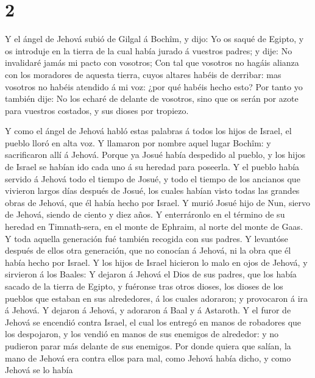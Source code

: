 \hypertarget{section-1}{%
\section{2}\label{section-1}}

 Y el ángel de Jehová subió de Gilgal á Bochîm, y dijo: Yo
os saqué de Egipto, y os introduje en la tierra de la cual había jurado
á vuestros padres; y dije: No invalidaré jamás mi pacto con vosotros;
 Con tal que vosotros no hagáis alianza con los moradores de
aquesta tierra, cuyos altares habéis de derribar: mas vosotros no habéis
atendido á mi voz: ¿por qué habéis hecho esto?  Por tanto yo
también dije: No los echaré de delante de vosotros, sino que os serán
por azote para vuestros costados, y sus dioses por tropiezo.

 Y como el ángel de Jehová habló estas palabras á todos los
hijos de Israel, el pueblo lloró en alta voz.  Y llamaron
por nombre aquel lugar Bochîm: y sacrificaron allí á Jehová.
 Porque ya Josué había despedido al pueblo, y los hijos de
Israel se habían ido cada uno á su heredad para poseerla.  Y
el pueblo había servido á Jehová todo el tiempo de Josué, y todo el
tiempo de los ancianos que vivieron largos días después de Josué, los
cuales habían visto todas las grandes obras de Jehová, que él había
hecho por Israel.  Y murió Josué hijo de Nun, siervo de
Jehová, siendo de ciento y diez años.  Y enterráronlo en el
término de su heredad en Timnath-sera, en el monte de Ephraim, al norte
del monte de Gaas.  Y toda aquella generación fué también
recogida con sus padres. Y levantóse después de ellos otra generación,
que no conocían á Jehová, ni la obra que él había hecho por Israel.
 Y los hijos de Israel hicieron lo malo en ojos de Jehová,
y sirvieron á los Baales:  Y dejaron á Jehová el Dios de
sus padres, que los había sacado de la tierra de Egipto, y fuéronse tras
otros dioses, los dioses de los pueblos que estaban en sus alrededores,
á los cuales adoraron; y provocaron á ira á Jehová.  Y
dejaron á Jehová, y adoraron á Baal y á Astaroth.  Y el
furor de Jehová se encendió contra Israel, el cual los entregó en manos
de robadores que los despojaron, y los vendió en manos de sus enemigos
de alrededor: y no pudieron parar más delante de sus enemigos.
 Por donde quiera que salían, la mano de Jehová era contra
ellos para mal, como Jehová había dicho, y como Jehová se lo había
